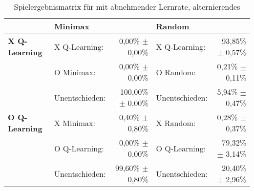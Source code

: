 \begin{table}[htbp]
\centering
    \caption[Spielergebnismatrix \qlearning: abnehmende Lernrate, alternierendes \splay]{Spielergebnismatrix für \qlearning mit abnehmender Lernrate, alternierendes \splay}
    \label{tab:resultmatrix_ql_alternate_alpha_decay}
    \begin{tabular}{llrlr}
    \toprule
     & \multicolumn{2}{l}{\textbf{Minimax}} & \multicolumn{2}{l}{\textbf{Random}} \\ \midrule
    \textbf{X Q-Learning}   & X Q-Learning:     & 0,00\% $\pm$    0,00\%            & X Q-Learning:         & 93,85\% $\pm$  0,57\%  \\
                            & O Minimax:        & 0,00\% $\pm$    0,00\%            & O Random:             & 0,21\% $\pm$   0,11\%  \\
                            & Unentschieden:    & 100,00\% $\pm$  0,00\%            & Unentschieden:        & 5,94\% $\pm$   0,47\%  \\ \cmidrule{2-5}
    \textbf{O Q-Learning}   & X Minimax:        & 0,40\% $\pm$    0,80\%            & X Random:             & 0,28\% $\pm$   0,37\%  \\
                            & O Q-Learning:     & 0,00\% $\pm$    0,00\%            & O Q-Learning:         & 79,32\% $\pm$  3,14\%  \\
                            & Unentschieden:    & 99,60\% $\pm$   0,80\%            & Unentschieden:        & 20,40\% $\pm$  2,96\%  \\ \bottomrule
    \end{tabular}
\end{table}